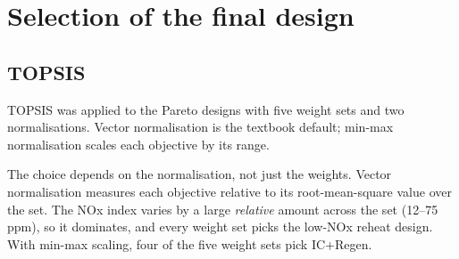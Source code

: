 \documentclass[10.5pt,a4paper]{article}
\begin{document}
\section{Selection of the final design}\label{sec:select}
\subsection{TOPSIS}
TOPSIS was applied to the \nPareto{} Pareto designs with five weight sets and two normalisations. Vector normalisation is the textbook default; min-max normalisation scales each objective by its range.
\begin{table}[H]\centering\scriptsize\caption{TOPSIS winners. LCOE in Rs/kWh, CO$_2$ in kg/kWh, NOx in ppm.}\label{tab:topsis}
\end{table}
The choice depends on the normalisation, not just the weights. Vector normalisation measures each objective relative to its root-mean-square value over the set. The NOx index varies by a large \emph{relative} amount across the set (12--75\,ppm), so it dominates, and every weight set picks the low-NOx reheat design. With min-max scaling, four of the five weight sets pick IC+Regen.
\end{document}
